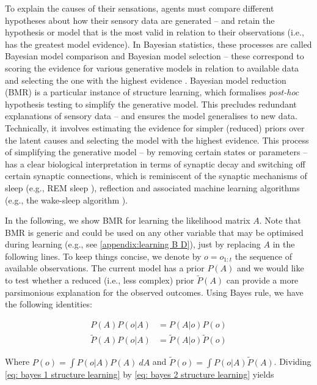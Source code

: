 \documentclass[review,12pt,authoryear]{elsarticle}
\begin{document}
To explain the causes of their sensations, agents must compare different hypotheses about how their sensory data are generated – and retain the hypothesis or model that is the most valid in relation to their observations (i.e., has the greatest model evidence). In Bayesian statistics, these processes are called Bayesian model comparison and Bayesian model selection -- these correspond to scoring the evidence for various generative models in relation to available data and selecting the one with the highest evidence \citep{claeskensModelSelectionModel2006,stephanBayesianModelSelection2009}.
Bayesian model reduction (BMR) is a particular instance of structure learning, which formalises \textit{post-hoc} hypothesis testing to simplify the generative model. This precludes redundant explanations of sensory data – and ensures the model generalises to new data. Technically, it involves estimating the evidence for simpler (reduced) priors over the latent causes and selecting the model with the highest evidence. This process of simplifying the generative model -- by removing certain states or parameters -- has a clear biological interpretation in terms of synaptic decay and switching off certain synaptic connections, which is reminiscent of the synaptic mechanisms of sleep (e.g., REM sleep \citep{hobsonWakingDreamingConsciousness2012,hobsonVirtualRealityConsciousness2014}), reflection and associated machine learning algorithms (e.g., the wake-sleep algorithm \citep{hintonWakesleepAlgorithmUnsupervised1995}).

In the following, we show BMR for learning the likelihood matrix $A$. Note that BMR is generic and could be used on any other variable that may be optimised during learning (e.g., see \ref{appendix:learning B D}), just by replacing $A$ in the following lines. To keep things concise, we denote by $o=o_{1:t}$ the sequence of available observations. The current model has a prior $P(A)$ and we would like to test whether a reduced (i.e., less complex) prior $\tilde P(A)$ can provide a more parsimonious explanation for the observed outcomes. Using Bayes rule, we have the following identities:

\begin{align}
P(A)P(o|A)&= P(A |o)P(o) \label{eq: bayes 1 structure learning}\\ 
\tilde P(A)P(o|A)&= \tilde P(A |o)\tilde P(o) \label{eq: bayes 2 structure learning}
\end{align}

Where $P(o)=\int P(o|A)P(A) \: dA$ and $\tilde P(o)=\int P(o|A) \tilde P(A)$. Dividing \eqref{eq: bayes 1 structure learning} by \eqref{eq: bayes 2 structure learning} yields
	 
\end{document}
